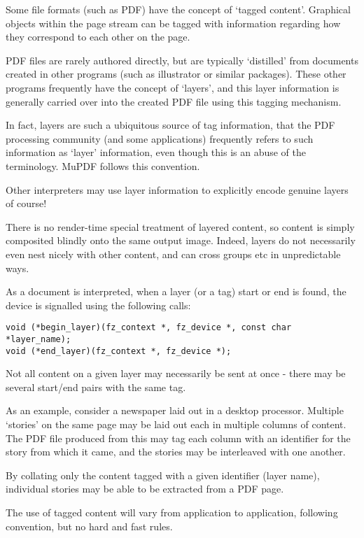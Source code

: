 \documentclass[oneside]{book}
\begin{document}
Some file formats (such as PDF) have the concept of `tagged content'. Graphical objects within the page stream can be tagged with information regarding how they correspond to each other on the page.

PDF files are rarely authored directly, but are typically `distilled' from documents created in other programs (such as illustrator or similar packages). These other programs frequently have the concept of `layers', and this layer information is generally carried over into the created PDF file using this tagging mechanism.

In fact, layers are such a ubiquitous source of tag information, that the PDF processing community (and some applications) frequently refers to such information as `layer' information, even though this is an abuse of the terminology. MuPDF follows this convention.

Other interpreters may use layer information to explicitly encode genuine layers of course!

There is no render-time special treatment of layered content, so content is simply composited blindly onto the same output image. Indeed, layers do not necessarily even nest nicely with other content, and can cross groups etc in unpredictable ways.

As a document is interpreted, when a layer (or a tag) start or end is found, the device is signalled using the following calls:

\begin{lstlisting}
void (*begin_layer)(fz_context *, fz_device *, const char *layer_name);
void (*end_layer)(fz_context *, fz_device *);
\end{lstlisting}

Not all content on a given layer may necessarily be sent at once - there may be several start/end pairs with the same tag.

As an example, consider a newspaper laid out in a desktop processor. Multiple `stories' on the same page may be laid out each in multiple  columns of content. The PDF file produced from this may tag each column with an identifier for the story from which it came, and the stories may be interleaved with one another.

By collating only the content tagged with a given identifier (layer name), individual stories may be able to be extracted from a PDF page.

The use of tagged content will vary from application to application, following convention, but no hard and fast rules.
\end{document}
